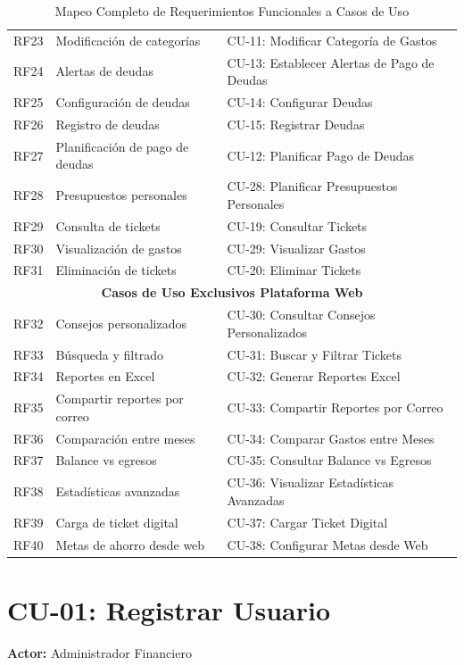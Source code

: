 \begin{table}[H]
\begin{tabular}{|l|l|l|}
RF23 & Modificación de categorías & CU-11: Modificar Categoría de Gastos \\
RF24 & Alertas de deudas & CU-13: Establecer Alertas de Pago de Deudas \\
RF25 & Configuración de deudas & CU-14: Configurar Deudas \\
RF26 & Registro de deudas & CU-15: Registrar Deudas \\
RF27 & Planificación de pago de deudas & CU-12: Planificar Pago de Deudas \\
RF28 & Presupuestos personales & CU-28: Planificar Presupuestos Personales \\
RF29 & Consulta de tickets & CU-19: Consultar Tickets \\
RF30 & Visualización de gastos & CU-29: Visualizar Gastos \\
RF31 & Eliminación de tickets & CU-20: Eliminar Tickets \\
\hline
\multicolumn{3}{|c|}{\textbf{Casos de Uso Exclusivos Plataforma Web}} \\
\hline
RF32 & Consejos personalizados & CU-30: Consultar Consejos Personalizados \\
RF33 & Búsqueda y filtrado & CU-31: Buscar y Filtrar Tickets \\
RF34 & Reportes en Excel & CU-32: Generar Reportes Excel \\
RF35 & Compartir reportes por correo & CU-33: Compartir Reportes por Correo \\
RF36 & Comparación entre meses & CU-34: Comparar Gastos entre Meses \\
RF37 & Balance vs egresos & CU-35: Consultar Balance vs Egresos \\
RF38 & Estadísticas avanzadas & CU-36: Visualizar Estadísticas Avanzadas \\
RF39 & Carga de ticket digital & CU-37: Cargar Ticket Digital \\
RF40 & Metas de ahorro desde web & CU-38: Configurar Metas desde Web \\
\hline
\end{tabular}
\caption{Mapeo Completo de Requerimientos Funcionales a Casos de Uso}
\end{table}

\section{CU-01: Registrar Usuario}

\noindent\textbf{Actor:} Administrador Financiero

